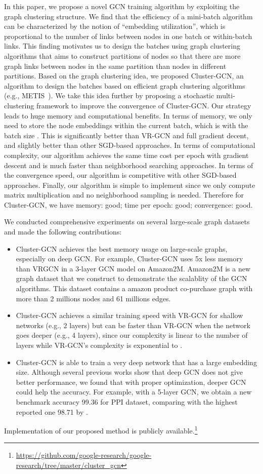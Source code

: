 \documentclass[sigconf]{acmart}
\begin{document}
In this paper, we propose a novel GCN training algorithm by exploiting the graph clustering structure. We find that the efficiency of a mini-batch algorithm can be characterized by the notion of ``embedding utilization'', which is proportional to the number of links between nodes in one batch or within-batch links. This finding motivates us to design the batches using graph clustering algorithms that aims to construct partitions of nodes so that there are more graph links between nodes in the same partition than nodes in different partitions. Based on the graph clustering idea, we proposed Cluster-GCN, an algorithm to design the batches based on efficient graph clustering algorithms (e.g., METIS~\citep{Metis}). We take this idea further by proposing a stochastic multi-clustering framework to improve the convergence of Cluster-GCN. Our strategy leads to huge memory and computational benefits. In terms of memory, we only need to store the node embeddings within the current batch, which is  with the batch size . This is significantly better than VR-GCN and full gradient decent, and slightly better than other SGD-based approaches. In terms of computational complexity, our algorithm achieves the same time cost per epoch with gradient descent and is much faster than neighborhood searching approaches. In terms of the convergence speed, our algorithm is competitive with other SGD-based approaches. Finally, our algorithm is simple to implement since we only compute matrix multiplication and no neighborhood sampling is needed. Therefore for Cluster-GCN, we have
memory: good; time per epoch: good; convergence: good.

We conducted comprehensive experiments on several large-scale graph datasets and made the following contributions: 
\begin{itemize}
\item Cluster-GCN achieves the best memory usage on large-scale graphs, especially on deep GCN. For example, Cluster-GCN uses 5x less memory than VRGCN in a 3-layer GCN model on Amazon2M. Amazon2M is a new graph dataset that we construct to demonstrate the scalablity of the GCN algorithms. This dataset contains a amazon product co-purchase graph with more than 2 millions nodes and 61 millions edges.
\item Cluster-GCN achieves a similar training speed with VR-GCN for shallow networks (e.g., 2 layers) but can be faster than VR-GCN when the network goes deeper (e.g., 4 layers), since our complexity is linear to the number of layers  while VR-GCN's complexity is exponential to .
\item Cluster-GCN is able to train a very deep network that has a large embedding size. Although several previous works show that deep GCN does not give better performance, we found that with proper optimization, deeper GCN could help the accuracy. For example, with a 5-layer GCN, we obtain a new benchmark accuracy 99.36 for PPI dataset, comparing with the highest reported one 98.71 by \cite{zhang2018gaan}.
\end{itemize}
Implementation of our proposed method is publicly available.\footnote{\url{https://github.com/google-research/google-research/tree/master/cluster\_gcn}}
\end{document}

